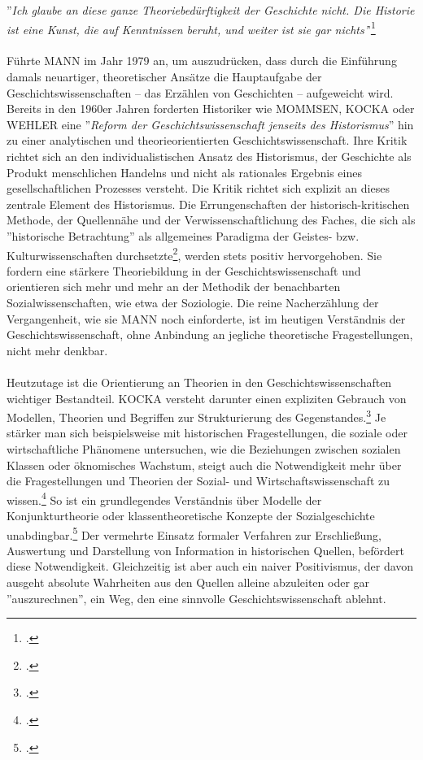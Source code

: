 \documentclass[12pt,a4paper]{article}
\begin{document}
''\textit{Ich glaube an diese ganze Theoriebedürftigkeit der Geschichte nicht. Die Historie ist eine Kunst, die auf Kenntnissen beruht, und weiter ist sie gar nichts'}'\footcite[][S.53]{mann1979pladoyer}
\\
\\
Führte MANN im Jahr 1979 an, um auszudrücken, dass durch die Einführung damals neuartiger, theoretischer Ansätze die Hauptaufgabe der Geschichtswissenschaften --  das Erzählen von Geschichten -- aufgeweicht wird. Bereits in den 1960er Jahren forderten Historiker wie MOMMSEN, KOCKA oder WEHLER eine ''\textit{Reform der Geschichtswissenschaft jenseits des Historismus}'' hin zu einer analytischen und theorieorientierten Geschichtswissenschaft. Ihre Kritik richtet sich an den individualistischen Ansatz des Historismus, der Geschichte als Produkt menschlichen Handelns und nicht als rationales Ergebnis eines gesellschaftlichen Prozesses versteht. Die Kritik richtet sich explizit an dieses zentrale Element des Historismus. Die Errungenschaften der historisch-kritischen Methode, der Quellennähe und der Verwissenschaftlichung des Faches, die sich als ''historische Betrachtung'' als allgemeines Paradigma der Geistes- bzw. Kulturwissenschaften durchsetzte\footcite[][S.28]{hardtwig1990geschichtskultur}, werden stets positiv hervorgehoben. Sie fordern eine stärkere Theoriebildung in der Geschichtswissenschaft und orientieren sich mehr und mehr an der Methodik der benachbarten Sozialwissenschaften, wie etwa der Soziologie. Die reine Nacherzählung der Vergangenheit, wie sie MANN noch einforderte, ist im heutigen Verständnis der Geschichtswissenschaft, ohne Anbindung an jegliche theoretische Fragestellungen, nicht mehr denkbar.
\\
\\
Heutzutage ist die Orientierung an Theorien in den Geschichtswissenschaften wichtiger Bestandteil. KOCKA versteht darunter einen expliziten Gebrauch von Modellen, Theorien und Begriffen zur Strukturierung des Gegenstandes.\footcite[][S.2]{magerski2009schreibt} Je stärker man sich beispielsweise mit historischen Fragestellungen, die soziale oder wirtschaftliche Phänomene untersuchen, wie die Beziehungen zwischen sozialen Klassen oder öknomisches Wachstum, steigt auch die Notwendigkeit mehr über die Fragestellungen und Theorien der Sozial- und Wirtschaftswissenschaft zu wissen.\footcite[][S.6-8]{kocka1982theorien} So ist ein grundlegendes Verständnis über Modelle der Konjunkturtheorie oder klassentheoretische Konzepte der Sozialgeschichte unabdingbar.\footcite[][S.1]{sokollgrundlagen} Der vermehrte Einsatz formaler Verfahren zur Erschließung, Auswertung und Darstellung von Information in historischen Quellen, befördert diese Notwendigkeit. Gleichzeitig ist aber auch ein naiver Positivismus, der davon ausgeht absolute Wahrheiten aus den Quellen alleine abzuleiten oder gar ''auszurechnen'', ein Weg, den eine sinnvolle Geschichtswissenschaft ablehnt.
\end{document}
